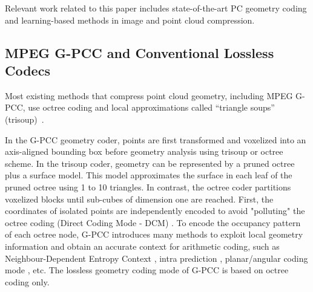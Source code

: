 

\par Relevant work related to this paper includes state-of-the-art PC geometry coding and learning-based methods in image and point cloud compression.

\subsection{MPEG G-PCC and Conventional Lossless Codecs}
\par Most existing methods that compress point cloud geometry, including MPEG G-PCC, use octree coding \cite{schnabel2006octree,7434610,6224647, garcia2017context, garcia2018intra, garcia2019geometry,huang2020octsqueeze, biswas2020muscle} and local approximations called ``triangle soups'' (trisoup)~\cite{schnabel2006octree,dricot2019adaptive}. 
\par In the G-PCC geometry coder, points are first transformed and voxelized into an axis-aligned bounding box before geometry analysis using trisoup or octree scheme. In the trisoup coder, geometry can be represented by a pruned octree plus a surface model. This model approximates the surface in each leaf of the pruned octree using 1 to 10 triangles. 
In contrast, the octree coder partitions voxelized blocks until sub-cubes of dimension one are reached. First, the coordinates of isolated points are independently encoded to avoid "polluting" the octree coding (Direct Coding Mode - DCM) \cite{dcm}. To encode the occupancy pattern of each octree node, G-PCC introduces many methods to exploit local geometry information and obtain an accurate context for arithmetic coding, such as Neighbour-Dependent Entropy Context \cite{neighbor}, intra prediction \cite{intracodinggpcc}, planar/angular coding mode \cite{planarcodingmode,angularcodingmode}, etc. The lossless geometry coding mode of G-PCC is based on octree coding only.

